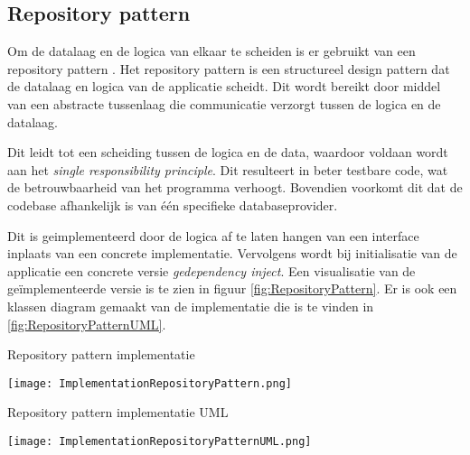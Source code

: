 \subsection{Repository pattern}
Om de datalaag en de logica van elkaar te scheiden is er gebruikt van een repository pattern \parencite{RepositoryPattern}.
Het repository pattern is een structureel design pattern dat de datalaag en logica van de applicatie scheidt.
Dit wordt bereikt door middel van een abstracte tussenlaag die communicatie verzorgt tussen de logica en de datalaag.

\whitespace
Dit leidt tot een scheiding tussen de logica en de data, waardoor voldaan wordt aan het \textit{single responsibility principle}.
Dit resulteert in beter testbare code, wat de betrouwbaarheid van het programma verhoogt.
Bovendien voorkomt dit dat de codebase afhankelijk is van één specifieke databaseprovider.

\whitespace
Dit is geimplementeerd door de logica af te laten hangen van een interface inplaats van een concrete implementatie.
Vervolgens wordt bij initialisatie van de applicatie  een concrete versie \textit{gedependency inject}.
Een visualisatie van de geïmplementeerde versie is te zien in figuur \ref{fig:RepositoryPattern}.
Er is ook een klassen diagram gemaakt van de implementatie die is te vinden in \ref{fig:RepositoryPatternUML}.

\whitespace[2]
\begin{graphic}
    \captionsetup{type=figure}
    \caption{Repository pattern implementatie}
    \texttt{[image: ImplementationRepositoryPattern.png]}
    \label{fig:RepositoryPattern}
\end{graphic}

\begin{graphic}
    \captionsetup{type=figure}
    \caption{Repository pattern implementatie UML}
    \texttt{[image: ImplementationRepositoryPatternUML.png]}
    \label{fig:RepositoryPatternUML}
\end{graphic}
